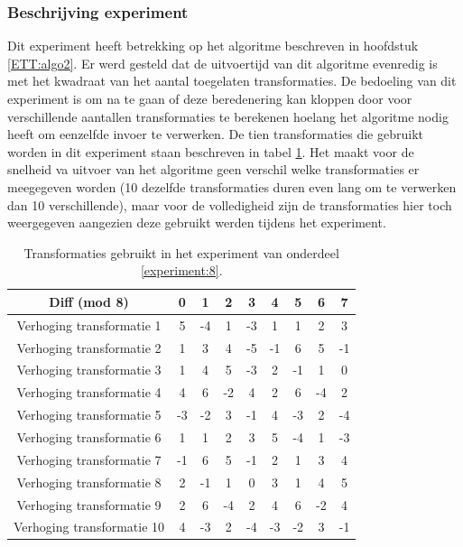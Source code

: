 \subsubsection{Beschrijving experiment}
Dit experiment heeft betrekking op het algoritme beschreven in hoofdstuk \ref{ETT:algo2}. Er werd gesteld dat de uitvoertijd van dit algoritme evenredig is met het kwadraat van het aantal toegelaten transformaties. De bedoeling van dit experiment is om na te gaan of deze beredenering kan kloppen door voor verschillende aantallen transformaties te berekenen hoelang het algoritme nodig heeft om eenzelfde invoer te verwerken. De tien transformaties die gebruikt worden in dit experiment staan beschreven in tabel \ref{tabel:exp8}. Het maakt voor de snelheid va uitvoer van het algoritme geen verschil welke transformaties er meegegeven worden (10 dezelfde transformaties duren even lang om te verwerken dan 10 verschillende), maar voor de volledigheid zijn de transformaties hier toch weergegeven aangezien deze gebruikt werden tijdens het experiment.

\begin{table}
  \centering
  \begin{tabular}{c | c c c c c c c c }
    Diff (mod 8) & 0 & 1 & 2 & 3 & 4 & 5 & 6 & 7 \\
    \hline
    \hline
    Verhoging transformatie 1 & 5 & -4 & 1 & -3 & 1 & 1 & 2 & 3 \\
    \hline
    Verhoging transformatie 2 & 1 & 3 & 4 & -5 & -1 & 6 & 5 & -1 \\
    \hline
    Verhoging transformatie 3 & 1 & 4 & 5 & -3 & 2 & -1 & 1 & 0 \\
    \hline
    Verhoging transformatie 4 & 4 & 6 & -2 & 4 & 2 & 6 & -4 & 2 \\
    \hline
    Verhoging transformatie 5 & -3 & -2 & 3 & -1 & 4 & -3 & 2 & -4 \\
    \hline
    Verhoging transformatie 6 & 1 & 1 & 2 & 3 & 5 & -4 & 1 & -3 \\
    \hline
    Verhoging transformatie 7 & -1 & 6 & 5 & -1 & 2 & 1 & 3 & 4 \\
    \hline
    Verhoging transformatie 8 & 2 & -1 & 1 & 0 & 3 & 1 & 4 & 5 \\
    \hline
    Verhoging transformatie 9 & 2 & 6 & -4 & 2 & 4 & 6 & -2 & 4 \\
    \hline
    Verhoging transformatie 10 & 4 & -3 & 2 & -4 & -3 & -2 & 3 & -1 \\
  \end{tabular}
  \caption{Transformaties gebruikt in het experiment van onderdeel \ref{experiment:8}.}
  \label{tabel:exp8}
\end{table}

